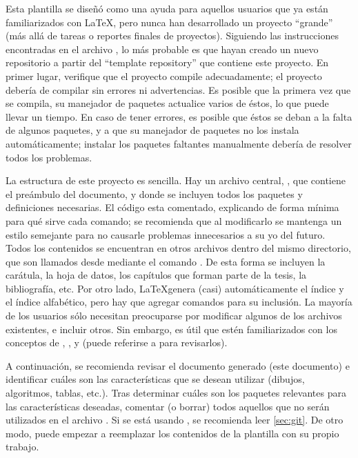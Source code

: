 Esta plantilla se dise\~n\'o como una ayuda para aquellos usuarios que ya
est\'an familiarizados con \LaTeX, pero nunca han desarrollado un proyecto
``grande'' (m\'as all\'a de tareas o reportes finales de proyectos).   Siguiendo
las instrucciones encontradas en el archivo , lo m\'as probable
es que hayan creado un nuevo repositorio a partir del ``template repository''
que contiene este proyecto.   En primer lugar, verifique que el proyecto compile
adecuadamente; el proyecto deber\'ia de compilar sin errores ni advertencias. Es
posible que la primera vez que se compila, su manejador de paquetes actualice
varios de \'estos, lo que puede llevar un tiempo.   En caso de tener errores, es
posible que \'estos se deban a la falta de algunos paquetes, y a que su
manejador de paquetes no los instala autom\'aticamente;  instalar los paquetes
faltantes manualmente deber\'ia de resolver todos los problemas.

La estructura de este proyecto es sencilla.   Hay un archivo central,
, que contiene el pre\'ambulo del documento, y donde se incluyen
todos los paquetes y definiciones necesarias.   El c\'odigo esta comentado,
explicando de forma m\'inima para qu\'e sirve cada comando; se recomienda que al
modificarlo se mantenga un estilo semejante para no causarle problemas
innecesarios a su yo del futuro.   Todos los contenidos se encuentran en otros
archivos dentro del mismo directorio, que son llamados desde 
mediante el comando .   De esta forma se
incluyen la car\'atula, la hoja de datos, los cap\'itulos que forman parte de la
tesis, la bibliograf\'ia, etc.   Por otro lado, \LaTeX genera (casi)
autom\'aticamente el \'indice y el \'indice alfab\'etico, pero hay que agregar
comandos para su inclusi\'on.  La mayor\'ia de los usuarios s\'olo necesitan
preocuparse por modificar algunos de los archivos existentes, e incluir otros.
Sin embargo, es \'util que est\'en familiarizados con los conceptos de
, ,  y  (puede
referirse a \cite{oetiker2007} para revisarlos).

A continuaci\'on, se recomienda revisar el documento generado (este documento) e
identificar cu\'ales son las caracter\'isticas que se desean utilizar (dibujos,
algoritmos, tablas, etc.).   Tras determinar cu\'ales son los paquetes
relevantes para las caracter\'isticas deseadas, comentar (o borrar) todos
aquellos que no ser\'an utilizados en el archivo .   Si se est\'a
usando , se recomienda leer \cref{sec:git}.   De otro modo, puede
empezar a reemplazar los contenidos de la plantilla con su propio trabajo.

